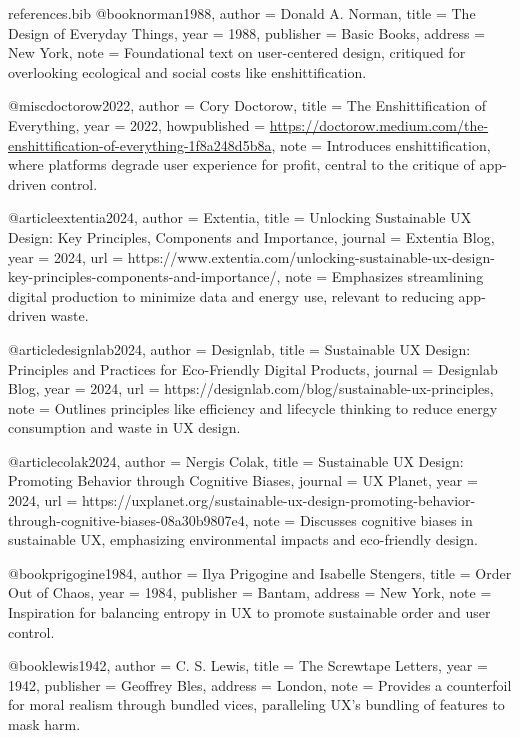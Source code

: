 \begin{filecontents*}{references.bib}
@book{norman1988,
  author    = {Donald A. Norman},
  title     = {The Design of Everyday Things},
  year      = {1988},
  publisher = {Basic Books},
  address   = {New York},
  note      = {Foundational text on user-centered design, critiqued for overlooking ecological and social costs like enshittification.}
}

@misc{doctorow2022,
  author    = {Cory Doctorow},
  title     = {The Enshittification of Everything},
  year      = {2022},
  howpublished = {\url{https://doctorow.medium.com/the-enshittification-of-everything-1f8a248d5b8a}},
  note      = {Introduces enshittification, where platforms degrade user experience for profit, central to the critique of app-driven control.}
}

@article{extentia2024,
  author    = {{Extentia}},
  title     = {Unlocking Sustainable UX Design: Key Principles, Components and Importance},
  journal   = {Extentia Blog},
  year      = {2024},
  url       = {https://www.extentia.com/unlocking-sustainable-ux-design-key-principles-components-and-importance/},
  note      = {Emphasizes streamlining digital production to minimize data and energy use, relevant to reducing app-driven waste.}
}

@article{designlab2024,
  author    = {{Designlab}},
  title     = {Sustainable UX Design: Principles and Practices for Eco-Friendly Digital Products},
  journal   = {Designlab Blog},
  year      = {2024},
  url       = {https://designlab.com/blog/sustainable-ux-principles},
  note      = {Outlines principles like efficiency and lifecycle thinking to reduce energy consumption and waste in UX design.}
}

@article{colak2024,
  author    = {Nergis Colak},
  title     = {Sustainable UX Design: Promoting Behavior through Cognitive Biases},
  journal   = {UX Planet},
  year      = {2024},
  url       = {https://uxplanet.org/sustainable-ux-design-promoting-behavior-through-cognitive-biases-08a30b9807e4},
  note      = {Discusses cognitive biases in sustainable UX, emphasizing environmental impacts and eco-friendly design.}
}

@book{prigogine1984,
  author    = {Ilya Prigogine and Isabelle Stengers},
  title     = {Order Out of Chaos},
  year      = {1984},
  publisher = {Bantam},
  address   = {New York},
  note      = {Inspiration for balancing entropy in UX to promote sustainable order and user control.}
}

@book{lewis1942,
  author    = {C. S. Lewis},
  title     = {The Screwtape Letters},
  year      = {1942},
  publisher = {Geoffrey Bles},
  address   = {London},
  note      = {Provides a counterfoil for moral realism through bundled vices, paralleling UX's bundling of features to mask harm.}
}


\end{filecontents*}
